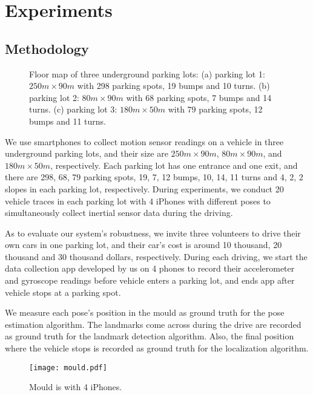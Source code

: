\section{Experiments}\label{sec:evaluation}

\subsection{Methodology}

\begin{figure*}[t]
      \centering
      \vspace{-2pt}
        \vfill
        \caption{Floor map of three underground parking lots: (a) parking lot 1: $250m\times 90m$ with 298 parking spots, 19 bumps and 10 turns. (b) parking lot 2: $80m\times 90m$ with 68 parking spots, 7 bumps and 14 turns. (c) parking lot 3: $180m\times 50m$ with 79 parking spots, 12 bumps and 11 turns. }\label{floorplan}
\end{figure*}

We use smartphones to collect motion sensor readings on a vehicle in three underground parking lots, and their size are $250m\times 90m$, $80m\times 90m$, and $180m\times 50m$, respectively.
Each parking lot has one entrance and one exit, and there are 298, 68, 79 parking spots, 19, 7, 12 bumps, 10, 14, 11 turns and 4, 2, 2 slopes in each parking lot, respectively. 
During experiments, we conduct 20 vehicle traces in each parking lot with 4 iPhones with different poses to simultaneously collect inertial sensor data during the driving.

As to evaluate our system's robustness, we invite three volunteers to drive their own cars in one parking lot, and their car's cost is around 10 thousand, 20 thousand and 30 thousand dollars, respectively.
During each driving, we start the data collection app developed by us on 4 phones to record their accelerometer and gyroscope readings before vehicle enters a parking lot, and ends app after vehicle stops at a parking spot.

We measure each pose's position in the mould as ground truth for the pose estimation algorithm.
The landmarks come across during the drive are recorded as ground truth for the landmark detection algorithm.
Also, the final position where the vehicle stops is recorded as ground truth for the localization algorithm.
\begin{figure}[h]
  \centering
  \texttt{[image: mould.pdf]}\\
  \vspace{5pt}
  \caption{Mould is with 4 iPhones. }\label{pix:mould}
\end{figure}

